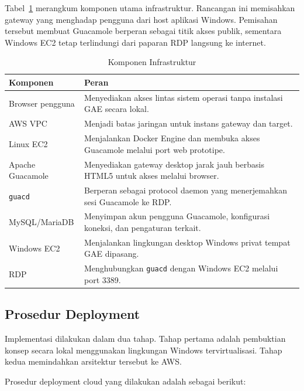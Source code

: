 \documentclass[conference]{IEEEtran}
\begin{document}
Tabel~\ref{tab:components} merangkum komponen utama infrastruktur. Rancangan ini memisahkan gateway yang menghadap pengguna dari host aplikasi Windows. Pemisahan tersebut membuat Guacamole berperan sebagai titik akses publik, sementara Windows EC2 tetap terlindungi dari paparan RDP langsung ke internet.

\begin{table}[!t]
\centering
\caption{Komponen Infrastruktur}
\label{tab:components}
\begin{tabularx}{\columnwidth}{p{2.2cm}X}
\toprule
\textbf{Komponen} & \textbf{Peran} \\
\midrule
Browser pengguna & Menyediakan akses lintas sistem operasi tanpa instalasi GAE secara lokal. \\
AWS VPC & Menjadi batas jaringan untuk instans gateway dan target. \\
Linux EC2 & Menjalankan Docker Engine dan membuka akses Guacamole melalui port web prototipe. \\
Apache Guacamole & Menyediakan gateway desktop jarak jauh berbasis HTML5 untuk akses melalui browser. \\
\texttt{guacd} & Berperan sebagai protocol daemon yang menerjemahkan sesi Guacamole ke RDP. \\
MySQL/MariaDB & Menyimpan akun pengguna Guacamole, konfigurasi koneksi, dan pengaturan terkait. \\
Windows EC2 & Menjalankan lingkungan desktop Windows privat tempat GAE dipasang. \\
RDP & Menghubungkan \texttt{guacd} dengan Windows EC2 melalui port 3389. \\
\bottomrule
\end{tabularx}
\end{table}

\subsection{Prosedur Deployment}

Implementasi dilakukan dalam dua tahap. Tahap pertama adalah pembuktian konsep secara lokal menggunakan lingkungan Windows tervirtualisasi. Tahap kedua memindahkan arsitektur tersebut ke AWS.

Prosedur deployment cloud yang dilakukan adalah sebagai berikut:
\end{document}
